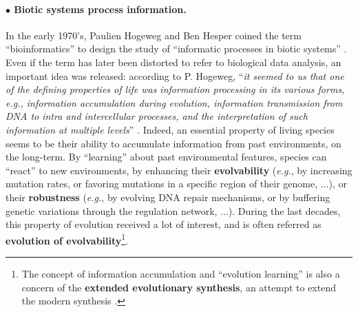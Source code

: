 \paragraph{$\bullet$ Biotic systems process information.}
In the early 1970's, Paulien Hogeweg and Ben Hesper coined the term ``bioinformatics'' to design the study of ``informatic processes in biotic systems'' \citep{hogeweg-hesper-1978,hogeweg-1978}. Even if the term has later been distorted to refer to biological data analysis, an important idea was released: according to P. Hogeweg, ``\textit{it seemed to us that one of the defining properties of life was information processing in its various forms, e.g., information accumulation during evolution, information transmission from DNA to intra and intercellular processes, and the interpretation of such information at multiple levels}'' \citep{hogeweg-2011}. Indeed, an essential property of living species seems to be their ability to accumulate information from past environments, on the long-term. By ``learning'' about past environmental features, species can ``react'' to new environments, by enhancing their \textbf{evolvability} (\textit{e.g.}, by increasing mutation rates, or favoring mutations in a specific region of their genome, ...), or their \textbf{robustness} (\textit{e.g.}, by evolving DNA repair mechanisms, or by buffering genetic variations through the regulation network, ...). During the last decades, this property of evolution received a lot of interest, and is often referred as \textbf{evolution of evolvability}\footnote{The concept of information accumulation and ``evolution learning'' is also a concern of the \textbf{extended evolutionary synthesis}, an attempt to extend the modern synthesis \citep{laland-et-al-2015,watson-szathmary-2016}.}.

